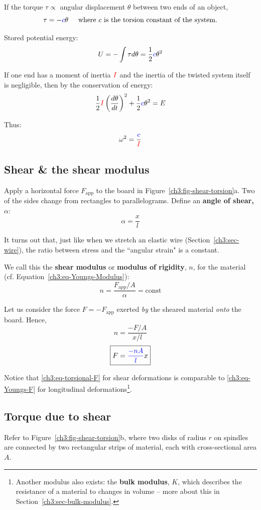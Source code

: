 If the torque $\tau \propto$ angular displacement $\theta$ between two ends of an object,
\[ \tau=-\textcolor{blue}{c}\theta \hspace{0.5cm}\text{where }\text{$c$ is the torsion constant of the system.} \]

Stored potential energy: \[ U= -\int \tau d\theta = \frac{1}{2} \textcolor{blue}{c}\theta^2 \]

If one end has a moment of inertia $\textcolor{red}{I}$ and the inertia of the twisted system itself is negligible, then by the conservation of energy:
\[ \frac{1}{2} \textcolor{red}{I} \left( \frac{d\theta}{dt}\right)^2 + \frac{1}{2} \textcolor{blue}{c}\theta^2 = E \]

Thus:
\begin{equation*}
\omega^2 = \frac{\textcolor{blue}{c}}{\textcolor{red}{I}}
\end{equation*}

\subsection{Shear \& the shear modulus}
Apply a horizontal force $F_\text{app}$ to the board in Figure~\ref{ch3:fig-shear-torsion}a. Two of the sides change from rectangles to parallelograms. Define an \textbf{angle of shear, $\alpha$}:
\[ \alpha = \frac{x}{l} \]

It turns out that, just like when we stretch an elastic wire (Section~\ref{ch3:sec-wire}), the ratio between stress and the ``angular strain" is a constant.

We call this the \textbf{shear modulus} or \textbf{modulus of rigidity}, $n$, for the material (cf. Equation~\ref{ch3:eq-Youngs-Modulus}):
\[  n= \frac{F_\text{app}/A}{\alpha} = \text{const} \]

Let us consider the force $F=-F_\text{app}$ exerted \emph{by} the sheared material \emph{onto} the board. Hence,
\[  n = \frac{-F/A}{x/l} \]
\begin{equation}
	\boxed{F = \textcolor{blue}{\frac{-nA}{l}} x}  \label{ch3:eq-torsional-F}
\end{equation}

Notice that \eqref{ch3:eq-torsional-F} for {shear deformations} is comparable to \eqref{ch3:eq-Youngs-F} for {longitudinal deformations}\footnote{Another modulus also exists: the \textbf{bulk modulus}, $K$, which describes the resistance of a material to changes in volume -- more about this in Section~\ref{ch3:sec-bulk-modulus}.}.

\subsection{Torque due to shear}
Refer to Figure~\ref{ch3:fig-shear-torsion}b, where two disks of radius $r$ on spindles are connected by two rectangular strips of material, each with cross-sectional area $A$.

